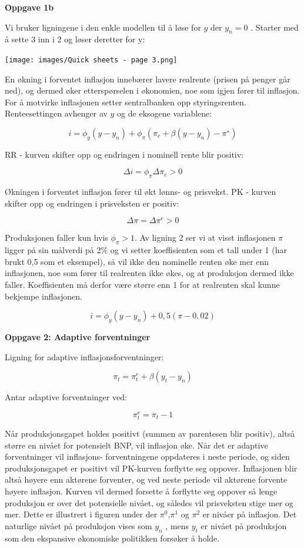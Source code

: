 \documentclass[
  letterpaper,
  DIV=11,
  numbers=noendperiod]{scrartcl}
\begin{document}
\textbf{Oppgave 1b}

Vi bruker ligningene i den enkle modellen til å løse for \(y\) der
\(y_n = 0\) . Starter med å sette 3 inn i 2 og løser deretter for y:

\texttt{[image: images/Quick sheets - page 3.png]}

En økning i forventet inflasjon innebærer lavere realrente (prisen på
penger går ned), og dermed øker etterspørselen i økonomien, noe som
igjen fører til inflasjon. For å motvirke inflasjonen setter
sentralbanken opp styringsrenten. Renteesettingen avhenger av \(y\) og
de eksogene variablene:

\[
𝑖 = 𝜙_𝑦(𝑦 − 𝑦_𝑛) + 𝜙_𝜋(𝜋_𝑒 + 𝛽(𝑦 − 𝑦_𝑛) − 𝜋^∗) 
\]

RR - kurven skifter opp og endringen i nominell rente blir positiv:

\[
𝛥i = 𝜙_𝜋𝛥𝜋_𝑒 > 0
\]

Økningen i forventet inflasjon fører til økt lønns- og prisvekst. PK -
kurven skifter opp og endringen i prisveksten er positiv:

\[ 𝛥𝜋 = 𝛥𝜋^e > 0 \]

Produksjonen faller kun hvis \(𝜙_𝜋 > 1\). Av ligning 2 ser vi at visst
inflasjonen \(𝜋\) ligger på sin målverdi på 2\% og vi setter
koeffisienten som et tall under 1 (har brukt 0,5 som et eksempel), så
vil ikke den nominelle renten øke mer enn inflasjonen, noe som fører til
realrenten ikke økes, og at produksjon dermed ikke faller. Koeffisienten
må derfor være større enn 1 for at realrenten skal kunne bekjempe
inflasjonen.

\[ 𝑖 = 𝜙_𝑦(𝑦 − 𝑦_𝑛) + 0,5(𝜋 − 0,02) \]

\textbf{Oppgave 2: Adaptive forventninger}

Ligning for adaptive inflasjonsforventninger:

\[
𝜋_t = 𝜋_𝑡^e + 𝛽(𝑦_𝑡 − 𝑦_𝑛)
\]

Antar adaptive forventninger ved:

\[
𝜋_t^e = 𝜋_𝑡−1
\]

Når produksjonsgapet holdes positivt (summen av parentesen blir
positiv), altså større en nivået for potensielt BNP, vil inflasjon øke.
Når det er adaptive forventninger vil inflasjons- forventningene
oppdateres i neste periode, og siden produksjonsgapet er positivt vil
PK-kurven forflytte seg oppover. Inflasjonen blir altså høyere enn
aktørene forventer, og ved neste periode vil aktørene forvente høyere
inflasjon. Kurven vil dermed forsette å forflytte seg oppover så lenge
produksjon er over det potensielle nivået, og således vil prisveksten
stige mer og mer. Dette er illustrert i figuren under der
\(𝜋^0\),\(𝜋^1\) og \(𝜋^2\) er nivåer på inflasjon. Det naturlige nivået
på produksjon vises som \(y_n\) , mens \(y_t\) er nivået på produksjon
som den ekspansive økonomiske politikken forsøker å holde.
\end{document}
